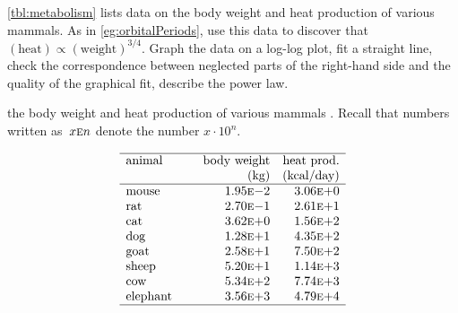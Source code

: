 \begin{exercise} \label{ex:metabolism} 
\autoref{tbl:metabolism} lists data on the body weight and heat production of various mammals. 
As in \autoref{eg:orbitalPeriods}, use this data to discover  that \((\text{heat})\propto(\text{weight})^{3/4}\).  
Graph the data on a log-log plot, fit a straight line, check the correspondence between neglected parts of the right-hand side and the quality of the graphical fit, describe the power law.
\setbox\ajrqrbox\hbox{}%
\marginpar{\usebox{\ajrqrbox\\[2ex]}}%
\begin{table}
\caption{the body weight and heat production of various mammals \cite[]{Kleiber1947}.  Recall that numbers written as~\(x\textsc{e}n\) denote the number \(x\cdot10^n\).}
\label{tbl:metabolism}
\begin{equation*}
\begin{array}{p{12ex}rr} \hline
animal&\text{body weight}&\text{heat prod.}\\
&(\text{kg})&\text{(kcal/day)}\\\hline
mouse&   1.95\textsc{e}{-}2 & 3.06\textsc{e}{+}0 \\
rat  &   2.70\textsc{e}{-}1 & 2.61\textsc{e}{+}1 \\
cat  &   3.62\textsc{e}{+}0 & 1.56\textsc{e}{+}2 \\
dog  &   1.28\textsc{e}{+}1 & 4.35\textsc{e}{+}2 \\
goat &   2.58\textsc{e}{+}1 & 7.50\textsc{e}{+}2 \\
sheep&   5.20\textsc{e}{+}1 & 1.14\textsc{e}{+}3 \\
cow  &   5.34\textsc{e}{+}2 & 7.74\textsc{e}{+}3 \\
elephant&3.56\textsc{e}{+}3 & 4.79\textsc{e}{+}4 \\
\hline
\end{array}
\end{equation*}
\end{table}%
\end{exercise}




